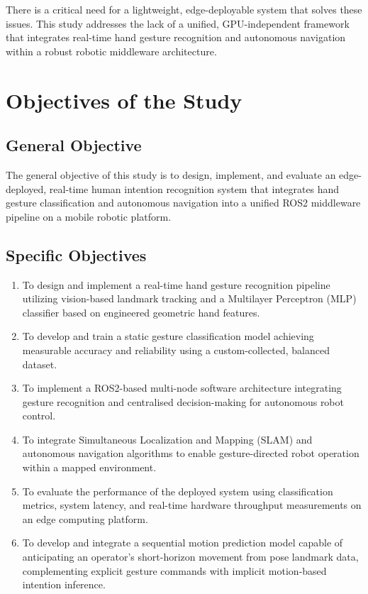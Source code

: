 There is a critical need for a lightweight, edge-deployable system that solves these issues. This study addresses the lack of a unified, GPU-independent framework that integrates real-time hand gesture recognition and autonomous navigation within a robust robotic middleware architecture.

\section{Objectives of the Study}
\subsection{General Objective}
The general objective of this study is to design, implement, and evaluate an edge-deployed, real-time human intention recognition system that integrates hand gesture classification and autonomous navigation into a unified ROS2 middleware pipeline on a mobile robotic platform.

\subsection{Specific Objectives}
\begin{enumerate}
    \item To design and implement a real-time hand gesture recognition pipeline utilizing vision-based landmark tracking and a Multilayer Perceptron (MLP) classifier based on engineered geometric hand features.
    \item To develop and train a static gesture classification model achieving measurable accuracy and reliability using a custom-collected, balanced dataset.
    \item To implement a ROS2-based multi-node software architecture integrating gesture recognition and centralised decision-making for autonomous robot control.
    \item To integrate Simultaneous Localization and Mapping (SLAM) and autonomous navigation algorithms to enable gesture-directed robot operation within a mapped environment.
    \item To evaluate the performance of the deployed system using classification metrics, system latency, and real-time hardware throughput measurements on an edge computing platform.
    \item To develop and integrate a sequential motion prediction model capable of anticipating an operator's short-horizon movement from pose landmark data, complementing explicit gesture commands with implicit motion-based intention inference.
\end{enumerate}

